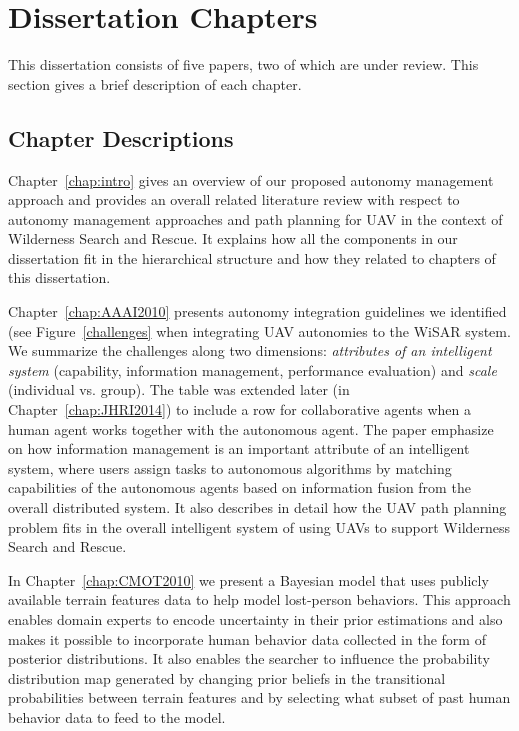 \section{Dissertation Chapters}

This dissertation consists of five papers, two of which are under review. This section gives a brief description of each chapter.

\subsection{Chapter Descriptions}

Chapter~\ref{chap:intro} gives an overview of our proposed autonomy management approach and provides an overall related literature review with respect to autonomy management approaches and path planning for UAV in the context of Wilderness Search and Rescue. It explains how all the components in our dissertation fit in the hierarchical structure and how they related to chapters of this dissertation.

Chapter~\ref{chap:AAAI2010} presents autonomy integration guidelines we identified (see Figure~\ref{challenges} when integrating UAV autonomies to the WiSAR system. We summarize the challenges along two dimensions: \textit{attributes of an intelligent system} (capability, information management, performance evaluation) and \textit{scale} (individual vs. group). The table was extended later (in Chapter~\ref{chap:JHRI2014}) to include a row for collaborative agents when a human agent works together with the autonomous agent. The paper emphasize on how information management is an important attribute of an intelligent system, where users assign tasks to autonomous algorithms by matching capabilities of the autonomous agents based on information fusion from the overall distributed system. It also describes in detail how the UAV path planning problem fits in the overall intelligent system of using UAVs to support Wilderness Search and Rescue.

In Chapter~\ref{chap:CMOT2010} we present a Bayesian model that uses publicly available terrain features data to help model lost-person behaviors. This approach enables domain experts to encode uncertainty in their prior estimations and also makes it possible to incorporate human behavior data collected in the form of posterior distributions. It also enables the searcher to influence the probability distribution map generated by changing prior beliefs in the transitional probabilities between terrain features and by selecting what subset of past human behavior data to feed to the model.

